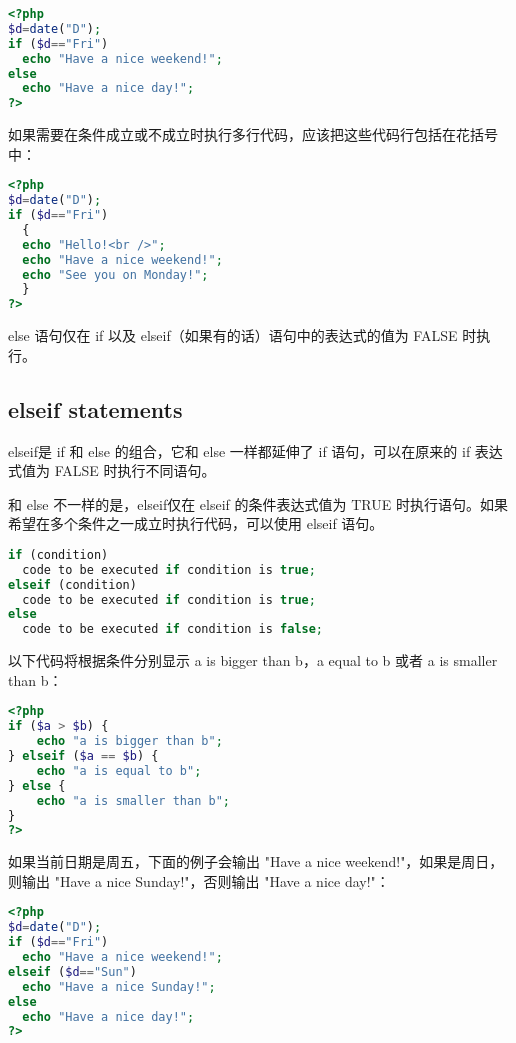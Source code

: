 \begin{lstlisting}[language=PHP]
<?php
$d=date("D");
if ($d=="Fri")
  echo "Have a nice weekend!"; 
else
  echo "Have a nice day!"; 
?>
\end{lstlisting}

如果需要在条件成立或不成立时执行多行代码，应该把这些代码行包括在花括号中：

\begin{lstlisting}[language=PHP]
<?php
$d=date("D");
if ($d=="Fri")
  {
  echo "Hello!<br />"; 
  echo "Have a nice weekend!";
  echo "See you on Monday!";
  }
?>
\end{lstlisting}

else 语句仅在 if 以及 elseif（如果有的话）语句中的表达式的值为 FALSE 时执行。


\subsection{elseif statements}

elseif是 if 和 else 的组合，它和 else 一样都延伸了 if 语句，可以在原来的 if 表达式值为 FALSE 时执行不同语句。

和 else 不一样的是，elseif仅在 elseif 的条件表达式值为 TRUE 时执行语句。如果希望在多个条件之一成立时执行代码，可以使用 elseif 语句。

\begin{lstlisting}[language=PHP]
if (condition)
  code to be executed if condition is true;
elseif (condition)
  code to be executed if condition is true;
else
  code to be executed if condition is false; 
\end{lstlisting}

以下代码将根据条件分别显示 a is bigger than b，a equal to b 或者 a is smaller than b：

\begin{lstlisting}[language=PHP]
<?php
if ($a > $b) {
    echo "a is bigger than b";
} elseif ($a == $b) {
    echo "a is equal to b";
} else {
    echo "a is smaller than b";
}
?>
\end{lstlisting}

如果当前日期是周五，下面的例子会输出 "Have a nice weekend!"，如果是周日，则输出 "Have a nice Sunday!"，否则输出 "Have a nice day!"：

\begin{lstlisting}[language=PHP]
<?php
$d=date("D");
if ($d=="Fri")
  echo "Have a nice weekend!"; 
elseif ($d=="Sun")
  echo "Have a nice Sunday!"; 
else
  echo "Have a nice day!"; 
?>
\end{lstlisting}

